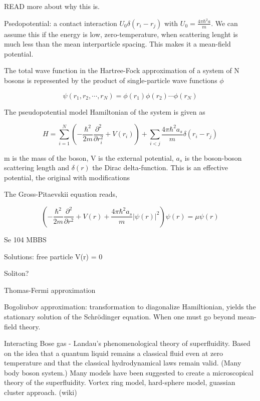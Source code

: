 READ more about why this is.

Psedopotential: a contact interaction $U_0 \delta(r_i - r_j)$
with $U_0 = \frac{4 \pi \hbar^2 a}{m}$.
We can assume this if the energy is low, zero-temperature, when scattering lenght is much less than the mean interparticle spacing. 
This makes it a mean-field potential. 

The total wave function in the Hartree-Fock approximation of a system of N bosons is represented by the product of single-particle wave functions $\phi$

\begin{equation}
\psi(r_1, r_2, \cdots, r_N) = \phi(r_1) \phi(r_2) \cdots \phi(r_N)
\end{equation}

The pseudopotential model Hamiltonian of the system is given as 

\begin{equation}
H = \sum_{i=1}^N \left( -\frac{\hbar^2}{2m} \frac{\partial^2}{\partial r_i^2} + V(r_i) \right) + \sum_{i<j} \frac{4 \pi \hbar^2 a_s}{m} \delta (r_i - r_j)
\end{equation}

m is the mass of the boson, V is the external potential, $a_s$ is the boson-boson scattering length and $\delta(r)$ the Dirac delta-function. This is an effective potential, the original  with modifications 

The Gross-Pitaevskii equation reads, 

\begin{equation}
\left( -\frac{\hbar^2}{2m} \frac{\partial^2}{\partial r^2} + V(r) + \frac{4 \pi \hbar^2 a_s}{m}|\psi(r)|^2 \right) \psi(r) = \mu \psi (r)
\end{equation}

Se 104 MBBS

Solutions: free particle V(r) = 0

Soliton?

Thomas-Fermi approximation

Bogoliubov approximation: transformation to diagonalize Hamiltionian, yields the stationary solution of the Schrödinger equation. When one must go beyond mean-field theory. 

Interacting Bose gas - Landau's phenomenological theory of superfluidity. Based on the idea that a quantum liquid remains a classical fluid even at zero temperature  and that the classical hydrodynamical laws remain valid. (Many body boson system.) 
Many models have been suggested to create a microscopical theory of the superfluidity. Vortex ring model, hard-sphere model, guassian cluster approach. (wiki)

